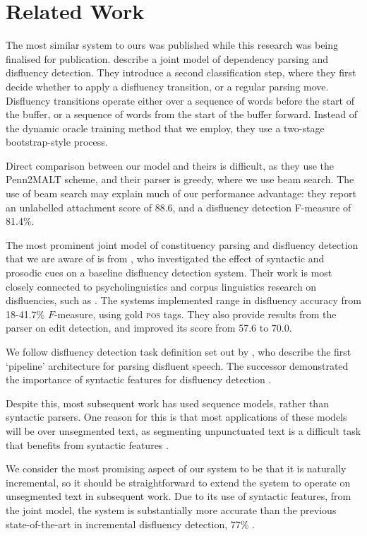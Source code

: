 \documentclass[11pt,letterpaper]{article}
\begin{document}
\section{Related Work}

The most similar system to ours was published while this research was being
finalised for publication. \citet{rasooli:13} describe a joint model of dependency
parsing and disfluency detection. They introduce a second classification step,
where they first decide whether to apply a disfluency transition, or a regular
parsing move. Disfluency transitions operate either over a sequence of words
before the start of the buffer, or a sequence of words from the start of the
buffer forward. Instead of the dynamic oracle training method that we employ,
they use a two-stage bootstrap-style process.

Direct comparison between our model and theirs is difficult,
as they use the Penn2MALT scheme, and their parser is greedy, where we use
beam search. The use of beam search may explain much of our performance advantage:
they report an unlabelled attachment score of 88.6, and a disfluency detection
F-measure of 81.4\%.

The most prominent joint model of constituency parsing and disfluency detection
that we are aware of is from \citet{hale:06}, who investigated the effect of
syntactic and prosodic cues on a baseline disfluency detection system.  Their
work is most closely connected to psycholinguistics and corpus linguistics research
on disfluencies, such as \citet{shriberg:98}. The systems \citeauthor{hale:06}
implemented range in disfluency accuracy from
18-41.7\% $F$-measure, using gold \textsc{pos} tags. They also provide results
from the  \citet{Charniak01a} parser on edit detection, and improved its score
from 57.6 to 70.0.

We follow disfluency detection task definition set out by 
\citet{Charniak01b}, who describe the first `pipeline' architecture for parsing
disfluent speech.  The successor
demonstrated the importance of syntactic features for disfluency detection
\citep{Johnson04a}.

Despite this, most subsequent work has used sequence models, rather than syntactic
parsers.  One reason for this is that most applications of these models will be
over unsegmented text, as segmenting unpunctuated text
is a difficult task that benefits from syntactic features \citep{zhang:13}.

We consider the most promising aspect of our system to be that it is naturally
incremental, so it should be straightforward to extend the system to operate
on unsegmented text in subsequent work.  Due to its use of syntactic features,
from the joint model, the system is substantially more accurate than the previous
state-of-the-art in incremental disfluency detection, 77\% \citep{zwarts:10}.
\end{document}
